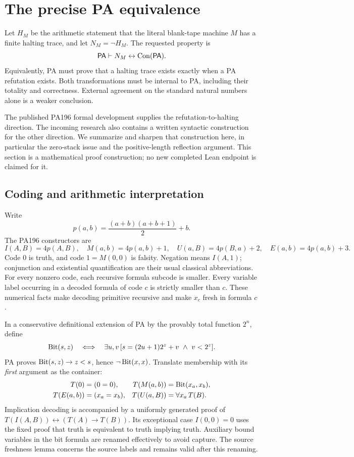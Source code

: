 \section{The precise PA equivalence}
\label{sec:calibration}
Let $H_M$ be the arithmetic statement that the literal blank-tape machine $M$ has a finite halting trace, and let $N_M=\neg H_M$. The requested property is
\begin{equation}\label{eq:target}
 \mathsf{PA}\vdash N_M\leftrightarrow\operatorname{Con}(\mathsf{PA}).
\end{equation}
Equivalently, PA must prove that a halting trace exists exactly when a PA refutation exists. Both transformations must be internal to PA, including their totality and correctness. External agreement on the standard natural numbers alone is a weaker conclusion.

The published PA196 formal development supplies the refutation-to-halting direction. The incoming research also contains a written syntactic construction for the other direction. We summarize and sharpen that construction here, in particular the zero-stack issue and the positive-length reflection argument. This section is a mathematical proof construction; no new completed Lean endpoint is claimed for it.

\subsection{Coding and arithmetic interpretation}
Write
\[
 p(a,b)=\frac{(a+b)(a+b+1)}2+b.
\]
The PA196 constructors are
\[
 I(A,B)=4p(A,B),\quad M(a,b)=4p(a,b)+1,\quad
 U(a,B)=4p(B,a)+2,\quad E(a,b)=4p(a,b)+3.
\]
Code $0$ is truth, and code $1=M(0,0)$ is falsity. Negation means $I(A,1)$; conjunction and existential quantification are their usual classical abbreviations. For every nonzero code, each recursive formula subcode is smaller. Every variable label occurring in a decoded formula of code $c$ is strictly smaller than $c$. These numerical facts make decoding primitive recursive and make $x_c$ fresh in formula $c$.

In a conservative definitional extension of PA by the provably total function $2^n$, define
\[
 \operatorname{Bit}(s,z)\quad\Longleftrightarrow\quad
 \exists u,v\,[s=(2u+1)2^z+v\ \wedge\ v<2^z].
\]
PA proves $\operatorname{Bit}(s,z)\to z<s$, hence $\neg\operatorname{Bit}(x,x)$. Translate membership with its \emph{first} argument as the container:
\begin{align*}
 T(0)&=(0=0), & T(M(a,b))&=\operatorname{Bit}(x_a,x_b),\\
 T(E(a,b))&=(x_a=x_b), & T(U(a,B))&=\forall x_a\,T(B).
\end{align*}
Implication decoding is accompanied by a uniformly generated proof of
$T(I(A,B))\leftrightarrow(T(A)\to T(B))$. Its exceptional case $I(0,0)=0$ uses the fixed proof that truth is equivalent to truth implying truth. Auxiliary bound variables in the bit formula are renamed effectively to avoid capture. The source freshness lemma concerns the source labels and remains valid after this renaming.

